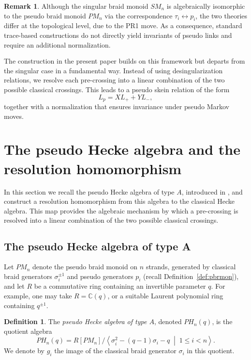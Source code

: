 \documentclass[11pt]{article}
\numberwithin{equation}{section}
\theoremstyle{definition}
\newtheorem{definition}[theorem]{Definition}
\newtheorem{remark}[theorem]{Remark}
\begin{document}
\begin{remark}
Although the singular braid monoid \(SM_n\) is algebraically isomorphic to the pseudo braid monoid \(PM_n\) via the correspondence \(\tau_i \leftrightarrow p_i\), the two theories differ at the topological level, due to the PR1 move. As a consequence, standard trace-based constructions do not directly yield invariants of pseudo links and require an additional normalization.

The construction in the present paper builds on this framework but departs from the singular case in a fundamental way. Instead of using desingularization relations, we resolve each pre-crossing into a linear combination of the two possible classical crossings. This leads to a pseudo skein relation of the form
\[
L_p = X L_+ + Y L_-,
\]
together with a normalization that ensures invariance under pseudo Markov moves.
\end{remark}



\section{The pseudo Hecke algebra and the resolution homomorphism}\label{pseudoheck}

In this section we recall the pseudo Hecke algebra of type \(A\), introduced in \cite{DiamantisPseudoST}, and construct a resolution homomorphism from this algebra to the classical Hecke algebra. This map provides the algebraic mechanism by which a pre-crossing is resolved into a linear combination of the two possible classical crossings.



\subsection{The pseudo Hecke algebra of type A}

Let \(PM_n\) denote the pseudo braid monoid on \(n\) strands, generated by classical braid generators \(\sigma_i^{\pm1}\) and pseudo generators \(p_i\) (recall Definition~\ref{def:pbrmon}), and let \(R\) be a commutative ring containing an invertible parameter \(q\). For example, one may take \(R=\mathbb{C}(q)\), or a suitable Laurent polynomial ring containing \(q^{\pm1}\).

\begin{definition}
The \emph{pseudo Hecke algebra of type \(A\)}, denoted \(PH_n(q)\), is the quotient algebra
\[
PH_n(q)
=
R[PM_n]\Big/
\left\langle
\sigma_i^2-(q-1)\sigma_i-q
\;\middle|\;
1\leq i<n
\right\rangle .
\]
We denote by \(g_i\) the image of the classical braid generator
\(\sigma_i\) in this quotient.
\end{definition}
\end{document}
